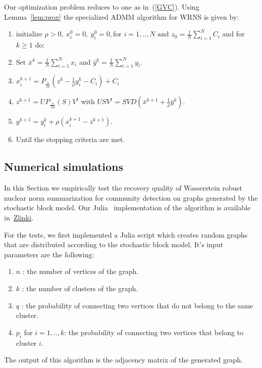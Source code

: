 \documentclass[12pt]{amsart}
\theoremstyle{remark}
\begin{document}
Our optimization problem reduces to one as in~(\ref{GVC}). Using Lemma~\ref{lem:prox} the specialized ADMM algorithm for WRNS is given by:

\begin{enumerate}
\item $\text{initialize } \rho >0, \  x_i^0=0, \  y_i^0=0, \text{for } i=1,..,N \text{ and } z_0= \frac{1}{N}\sum_{i=1}^N C_i$ and for $k\geq 1$ do:
\item $ \text{Set } \bar{x}^{k} = \frac{1}{N}\sum_{i=1}^N x_i $ and $\bar{y}^{k} = \frac{1}{N}\sum_{i=1}^N y_i $.
\item $x_i^{k+1}=P_{\frac{1}{2\rho}}(z^k-\frac{1}{\rho}y_i^k-C_i)+C_i$
\item $z^{k+1} = UP_{\frac{\lambda}{N\rho}}(S)V^t$ with $USV^t = SVD(\bar{x}^{k+1}+\frac{1}{\rho}\bar{y}^k)$.
\item $y^{k+1} =y_i^k + \rho(x_i^{k+1}-z^{k+1}). $ 
\item Until the stopping criteria are met.
\end{enumerate}




\subsection{Numerical simulations}
\label{Numerics}
In this Section we empirically test the recovery quality of Wasserstein robust nuclear norm summarization for community detection on graphs generated by the stochastic block model. 
Our Julia~\cite{Julia} implementation of the algorithm is available in~\url{Zlinki}.

For the tests, we first implemented a Julia script which creates random graphs that are distributed according to the stochastic block model. It's input parameters are the following:
\begin{enumerate}
\item $n$ : the number of vertices of the graph.
\item $k$ : the number of clusters of the graph.
\item $q$ : the probability of connecting two vertices that do not belong to the same cluster.
\item $p_i$ for $i=1,..,k$: the probability of connecting two vertices that belong to cluster $i$.
\end{enumerate}
The output of this algorithm is the adjacency matrix of the generated graph. 
\end{document}

